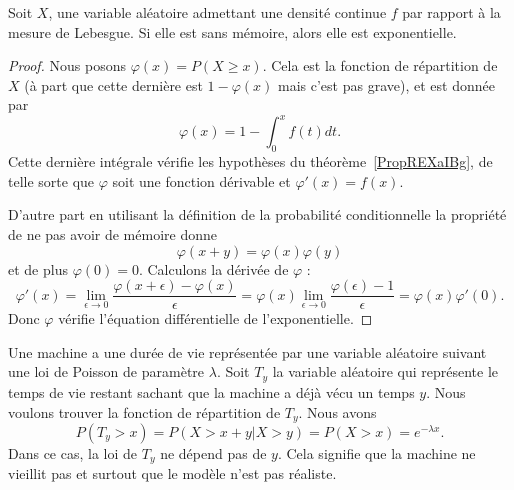 \begin{proposition} \label{PropREXaIBg}
	Soit \( X\), une variable aléatoire admettant une densité continue \( f\) par rapport à la mesure de Lebesgue. Si elle est sans mémoire, alors elle est exponentielle.
\end{proposition}

\begin{proof}
	Nous posons \( \varphi(x)=P(X\geq x)\). Cela est la fonction de répartition de \( X\) (à part que cette dernière est \( 1-\varphi(x)\) mais c'est pas grave), et est donnée par
	\begin{equation}
		\varphi(x)=1-\int_0^xf(t)dt.
	\end{equation}
	Cette dernière intégrale vérifie les hypothèses du théorème~\ref{PropREXaIBg}, de telle sorte que \( \varphi\) soit une fonction dérivable et \( \varphi'(x)=f(x)\).

	D'autre part en utilisant la définition de la probabilité conditionnelle la propriété de ne pas avoir de mémoire donne
	\begin{equation}
		\varphi(x+y)=\varphi(x)\varphi(y)
	\end{equation}
	et de plus \( \varphi(0)=0\). Calculons la dérivée de \( \varphi\) :
	\begin{equation}
		\varphi'(x)=\lim_{\epsilon\to 0}\frac{ \varphi(x+\epsilon)-\varphi(x) }{ \epsilon }=\varphi(x)\lim_{\epsilon\to 0}\frac{ \varphi(\epsilon)-1 }{ \epsilon }=\varphi(x)\varphi'(0).
	\end{equation}
	Donc \( \varphi\) vérifie l'équation différentielle de l'exponentielle.

\end{proof}

\begin{example}
	Une machine a une durée de vie représentée par une variable aléatoire suivant une loi de Poisson de paramètre \( \lambda\). Soit \( T_y\) la variable aléatoire qui représente le temps de vie restant sachant que la machine a déjà vécu un temps \( y\). Nous voulons trouver la fonction de répartition de \( T_y\). Nous avons
	\begin{equation}
		P(T_y>x)=P(X>x+y|X>y)=P(X>x)= e^{-\lambda x}.
	\end{equation}
	Dans ce cas, la loi de \( T_y\) ne dépend pas de \( y\). Cela signifie que la machine ne vieillit pas et surtout que le modèle n'est pas réaliste.
\end{example}

